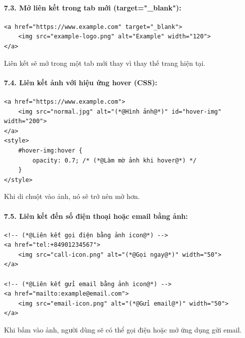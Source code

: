 \paragraph{7.3. Mở liên kết trong tab mới (target="\_blank"):}
\begin{codeWindow}
\begin{lstlisting}[language=HTML5]
<a href="https://www.example.com" target="_blank">
    <img src="example-logo.png" alt="Example" width="120">
</a>
\end{lstlisting}
\end{codeWindow}

Liên kết sẽ mở trong một tab mới thay vì thay thế trang hiện tại.

\paragraph{7.4. Liên kết ảnh với hiệu ứng hover (CSS):}
\begin{codeWindow}
\begin{lstlisting}[language=HTML5]
<a href="https://www.example.com">
    <img src="normal.jpg" alt="(*@Hình ảnh@*)" id="hover-img" width="200">
</a>
<style>
    #hover-img:hover {
        opacity: 0.7; /* (*@Làm mờ ảnh khi hover@*) */
    }
</style>
\end{lstlisting}
\end{codeWindow}

Khi di chuột vào ảnh, nó sẽ trở nên mờ hơn.

\paragraph{7.5. Liên kết đến số điện thoại hoặc email bằng ảnh:}
\begin{codeWindow}
\begin{lstlisting}[language=HTML5]
<!-- (*@Liên kết gọi điện bằng ảnh icon@*) -->
<a href="tel:+84901234567">
    <img src="call-icon.png" alt="(*@Gọi ngay@*)" width="50">
</a>

<!-- (*@Liên kết gửi email bằng ảnh icon@*) -->
<a href="mailto:example@email.com">
    <img src="email-icon.png" alt="(*@Gửi email@*)" width="50">
</a>
\end{lstlisting}
\end{codeWindow}

Khi bấm vào ảnh, người dùng sẽ có thể gọi điện hoặc mở ứng dụng gửi email.


